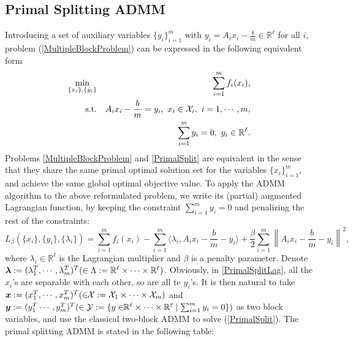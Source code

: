 \documentclass{mcom-l}
\theoremstyle{definition}
\theoremstyle{remark}
\numberwithin{equation}{section}
\begin{document}
\subsection{Primal Splitting ADMM}\label{subPrimalSplit}

Introducing a set of auxiliary variables $\{y_i\}_{i=1}^{m}$ with $y_i=A_ix_i-\frac{b}{m}\in\mathbb{R}^{\ell}$ for all $i$, problem (\ref{MultipleBlockProblem}) can be expressed in the following equivalent form
\begin{eqnarray}\label{PrimalSplit}
\min_{\{x_i\}, \{y_i\}} && \sum_{i=1}^m f_i(x_i),\nonumber\\
\hbox{s.t.}&& A_i x_i - \frac{b}{m} = y_i, \ x_i\in {\mathcal{X}}_i,\ i = 1,\cdots,m,\\
&&\sum_{i=1}^m y_i = 0,\ y_i\in\mathbb{R}^{\ell}\nonumber.
\end{eqnarray}
Problems \eqref{MultipleBlockProblem} and \eqref{PrimalSplit} are equivalent in the sense that they share the same primal optimal solution set for the variables $\{x_i\}_{i=1}^{m}$, and achieve the same global optimal objective value. To apply the ADMM algorithm to the above reformulated problem, we write its (partial) augmented Lagrangian function, by keeping the constraint $\sum\limits_{i=1}^m y_i = 0$ and penalizing the rest of the constraints:
\begin{equation}\label{PrimalSplitLag}
L_{\beta}(\{x_i\},\{y_i\},\{\lambda_i\}) = \sum_{i=1}^m f_i(x_i) -
\sum_{i=1}^m \langle \lambda_i, A_i x_i - \frac{b}{m} - y_i \rangle
+ \frac{\beta}{2} \sum_{i=1}^m \left\| A_i x_i - \frac{b}{m} - y_i
\right\|^2,
\end{equation}
where $\lambda_i\in \mathbb{R}^{\ell}$ is the Lagrangian multiplier and $\beta$ is a penalty parameter. Denote $\mbox{\boldmath$\lambda$}: = (\lambda_1^T,\cdots,\lambda_m^T)^T(\in \Lambda:=\mathbb{R}^{\ell}\times\cdots\times\mathbb{R}^{\ell})$. Obviously, in \eqref{PrimalSplitLag}, all the $x_i$'s are separable with each other, so are all te $y_i$'s.  It is then natural to take $\mbox{\boldmath$x$}: = (x_1^T,\cdots,x_m^T)^T(\in\!\! {\mathcal{X}} := {\mathcal{X}}_1\times\cdots\times{\mathcal{X}}_m)$ and $\mbox{\boldmath$y$} : = (y_1^T \cdots,y_m^T)^T(\in {\mathcal{Y}} :=\{y\in\!\! \mathbb{R}^{\ell}\times\cdots\times\mathbb{R}^{\ell} \mid \sum_{i=1}^m y_i = 0\})$ as two block variables, and use the classical two-block ADMM to solve  (\ref{PrimalSplit}). The primal splitting ADMM is stated in the following table:
\end{document}
